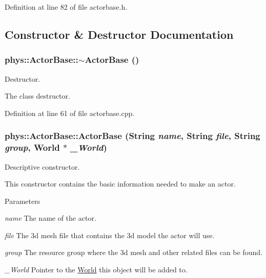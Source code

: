 Definition at line 82 of file actorbase.h.



\subsection{Constructor \& Destructor Documentation}
\hypertarget{classphys_1_1ActorBase_a5e5d4b50c83c6851e554b5e7ad65403f}{
\subsubsection[{$\sim$ActorBase}]{\setlength{\rightskip}{0pt plus 5cm}phys::ActorBase::$\sim$ActorBase ()}}
\label{d8/d0f/classphys_1_1ActorBase_a5e5d4b50c83c6851e554b5e7ad65403f}


Destructor. 

The class destructor. 

Definition at line 61 of file actorbase.cpp.

\hypertarget{classphys_1_1ActorBase_ad9d90a68921ce81653e9950c1330809d}{
\subsubsection[{ActorBase}]{\setlength{\rightskip}{0pt plus 5cm}phys::ActorBase::ActorBase ({\bf String} {\em name}, \/  {\bf String} {\em file}, \/  {\bf String} {\em group}, \/  {\bf World} $\ast$ {\em \_\-World})}}
\label{d8/d0f/classphys_1_1ActorBase_ad9d90a68921ce81653e9950c1330809d}


Descriptive constructor. 

This constructor contains the basic information needed to make an actor. 
\begin{DoxyParams}{Parameters}
\item[{\em name}]The name of the actor. \item[{\em file}]The 3d mesh file that contains the 3d model the actor will use. \item[{\em group}]The resource group where the 3d mesh and other related files can be found. \item[{\em \_\-World}]Pointer to the \hyperlink{classphys_1_1World}{World} this object will be added to. \end{DoxyParams}


